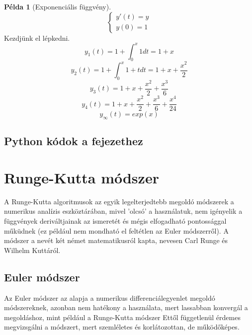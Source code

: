 \documentclass{article}
\theoremstyle{definition}
\theoremstyle{theorem}
\newtheorem{example}{Példa}
\begin{document}
\begin{example}[Exponenciális függvény]
\begin{equation*}
    \begin{cases}
       y'(t) = y\\
       y(0) = 1
    \end{cases}
\end{equation*}
Kezdjünk el lépkedni.
\begin{equation*}
    y_1(t) = 1 + \int_0^x 1 dt = 1 + x
\end{equation*}
\begin{equation*}
    y_2(t) = 1 + \int_0^x 1+t dt = 1 + x + \frac{x^2}{2}
\end{equation*}
\begin{equation*}
    y_3(t) =  1 + x + \frac{x^2}{2} + \frac{x^3}{6}
\end{equation*}
\begin{equation*}
    y_4(t) = 1 + x + \frac{x^2}{2} + \frac{x^3}{6} + \frac{x^4}{24}
\end{equation*}
\begin{equation*}
    y_{\infty}(t) = exp(x)
\end{equation*}
\end{example}
\subsection{Python kódok a fejezethez}

\section{Runge-Kutta módszer}
A Runge-Kutta algoritmusok az egyik legelterjedtebb megoldó módszerek a numerikus analízis eszköztárában, mivel 'olcsó' a használatuk, nem igényelik a függvények deriváltjainak az ismeretét és mégis elfogadható pontossággal műküdnek (ez például nem mondható el feltétlen az Euler módszerről). A módszer a nevét két német matematikusról kapta, nevesen Carl Runge és Wilhelm Kuttáról.

\subsection{Euler módszer}
Az Euler módszer az alapja a numerikus differenciálegyenlet megoldó módszereknek, azonban nem hatékony a használata, mert lassabban konvergál a megoldáshoz, mint például a Runge-Kutta módszer Ettől függetlenül érdemes megvizsgálni a módszert, mert szemléletes és korlátozottan, de működőképes.
\end{document}
